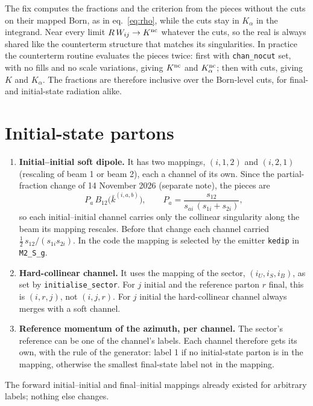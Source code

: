 \documentclass[11pt,a4paper]{article}
\newcommand{\kb}{\bar k}
\newcommand{\nc}{{\rm nc}}
\begin{document}
The fix computes the fractions and the criterion from the pieces without the
cuts on their mapped Born, as in eq.~\eqref{eq:rho}, while the cuts stay in
$K_\alpha$ in the integrand. Near every limit $R\,W_{ij}\to K^\nc$ whatever the
cuts, so the real is always shared like the counterterm structure that matches
its singularities. In practice the counterterm routine evaluates the pieces
twice: first with \texttt{chan\_nocut} set, with no fills and no scale
variations, giving $K^\nc$ and $K^\nc_\alpha$; then with cuts, giving $K$ and
$K_\alpha$. The fractions are therefore inclusive over the Born-level cuts, for
final- and initial-state radiation alike.

\section{Initial-state partons}
\label{sec:isr}

\begin{enumerate}
\item \textbf{Initial--initial soft dipole.} It has two mappings, $(i,1,2)$
      and $(i,2,1)$ (rescaling of beam 1 or beam 2), each a channel of its
      own. Since the partial-fraction change of 14 November 2026 (separate
      note), the pieces are
      \begin{equation}
        P_a\,B_{12}\big(\kb^{(i,a,b)}\big),
        \qquad P_a = \frac{s_{12}}{s_{ai}\,(s_{1i}+s_{2i})},
      \end{equation}
      so each initial--initial channel carries only the collinear singularity
      along the beam its mapping rescales. Before that change each channel
      carried $\frac12\,s_{12}/(s_{1i}s_{2i})$. In the code the mapping is
      selected by the emitter \texttt{kedip} in \texttt{M2\_S\_g}.
\item \textbf{Hard-collinear channel.} It uses the mapping of the sector,
      $(i_U,i_S,i_B)$, as set by \texttt{initialise\_sector}. For $j$ initial
      and the reference parton $r$ final, this is $(i,r,j)$, not
      $(i,j,r)$. For $j$ initial the hard-collinear channel always merges with
      a soft channel.
\item \textbf{Reference momentum of the azimuth, per channel.} The sector's
      reference can be one of the channel's labels. Each channel therefore
      gets its own, with the rule of the generator: label 1 if no
      initial-state parton is in the mapping, otherwise the smallest
      final-state label not in the mapping.
\end{enumerate}
The forward initial--initial and final--initial mappings already existed for
arbitrary labels; nothing else changes.
\end{document}
